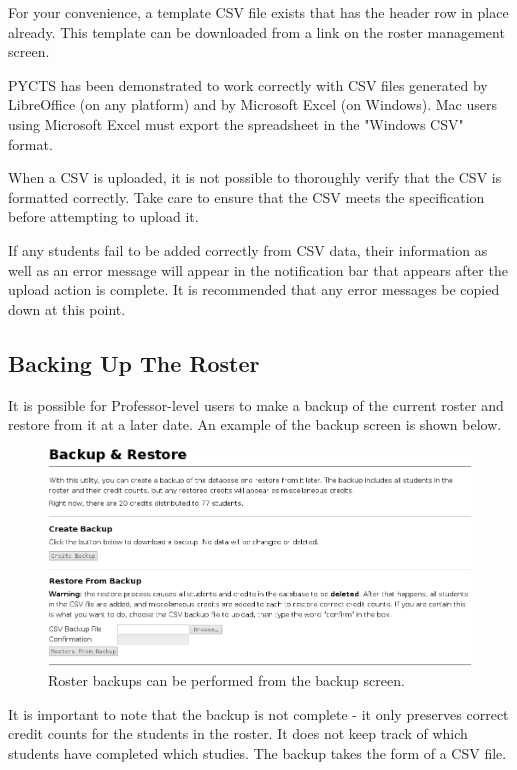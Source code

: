 \documentclass[letterpaper,titlepage]{article}
\begin{document}
For your convenience, a template CSV file exists that has the header row in place already. This template can be downloaded from a link on the roster management screen.

PYCTS has been demonstrated to work correctly with CSV files generated by LibreOffice (on any platform) and by Microsoft Excel (on Windows). Mac users using Microsoft Excel must export the spreadsheet in the "Windows CSV" format.

When a CSV is uploaded, it is not possible to thoroughly verify that the CSV is formatted correctly. Take care to ensure that the CSV meets the specification before attempting to upload it.

If any students fail to be added correctly from CSV data, their information as well as an error message will appear in the notification bar that appears after the upload action is complete. It is recommended that any error messages be copied down at this point.

\subsection{Backing Up The Roster}
It is possible for Professor-level users to make a backup of the current roster and restore from it at a later date. An example of the backup screen is shown below.

\begin{figure}[H]
\includegraphics[width=\textwidth]{images/prof_backup.png}
\caption{Roster backups can be performed from the backup screen.}
\label{prof_backup}
\end{figure}

It is important to note that the backup is not complete - it only preserves correct credit counts for the students in the roster. It does not keep track of which students have completed which studies. The backup takes the form of a CSV file.
\end{document}
